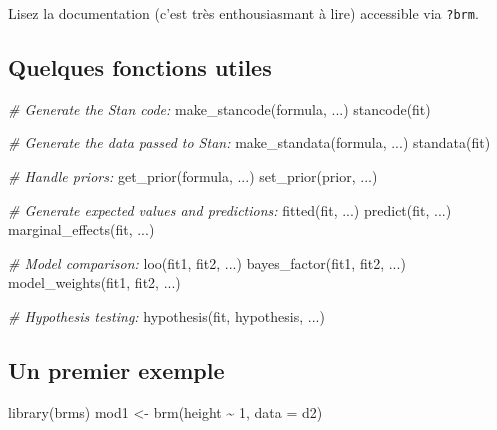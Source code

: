 \documentclass[
  a4paper,11pt,twoside,onecolumn,openright,final,oldfontcommands]{memoir}
\newenvironment{Shaded}{\begin{snugshade}}{\end{snugshade}}
\newcommand{\AttributeTok}[1]{\textcolor[rgb]{0.77,0.63,0.00}{#1}}
\newcommand{\CommentTok}[1]{\textcolor[rgb]{0.56,0.35,0.01}{\textit{#1}}}
\newcommand{\DecValTok}[1]{\textcolor[rgb]{0.00,0.00,0.81}{#1}}
\newcommand{\FunctionTok}[1]{\textcolor[rgb]{0.00,0.00,0.00}{#1}}
\newcommand{\NormalTok}[1]{#1}
\newcommand{\OtherTok}[1]{\textcolor[rgb]{0.56,0.35,0.01}{#1}}
\newcommand{\SpecialCharTok}[1]{\textcolor[rgb]{0.00,0.00,0.00}{#1}}
\theoremstyle{definition}
\theoremstyle{definition}
\theoremstyle{definition}
\theoremstyle{definition}
\theoremstyle{remark}
\begin{document}
Lisez la documentation (c'est très enthousiasmant à lire) accessible via \texttt{?brm}.

\hypertarget{quelques-fonctions-utiles}{%
\subsection{Quelques fonctions utiles}\label{quelques-fonctions-utiles}}

\begin{Shaded}
\begin{Highlighting}[]
\CommentTok{\# Generate the Stan code:}
\FunctionTok{make\_stancode}\NormalTok{(formula, ...)}
\FunctionTok{stancode}\NormalTok{(fit)}

\CommentTok{\# Generate the data passed to Stan:}
\FunctionTok{make\_standata}\NormalTok{(formula, ...)}
\FunctionTok{standata}\NormalTok{(fit)}

\CommentTok{\# Handle priors:}
\FunctionTok{get\_prior}\NormalTok{(formula, ...)}
\FunctionTok{set\_prior}\NormalTok{(prior, ...)}

\CommentTok{\# Generate expected values and predictions:}
\FunctionTok{fitted}\NormalTok{(fit, ...)}
\FunctionTok{predict}\NormalTok{(fit, ...)}
\FunctionTok{marginal\_effects}\NormalTok{(fit, ...)}

\CommentTok{\# Model comparison:}
\FunctionTok{loo}\NormalTok{(fit1, fit2, ...)}
\FunctionTok{bayes\_factor}\NormalTok{(fit1, fit2, ...)}
\FunctionTok{model\_weights}\NormalTok{(fit1, fit2, ...)}

\CommentTok{\# Hypothesis testing:}
\FunctionTok{hypothesis}\NormalTok{(fit, hypothesis, ...)}
\end{Highlighting}
\end{Shaded}

\hypertarget{un-premier-exemple}{%
\subsection{Un premier exemple}\label{un-premier-exemple}}

\begin{Shaded}
\begin{Highlighting}[]
\FunctionTok{library}\NormalTok{(brms)}
\NormalTok{mod1 }\OtherTok{\textless{}{-}} \FunctionTok{brm}\NormalTok{(height }\SpecialCharTok{\textasciitilde{}} \DecValTok{1}\NormalTok{, }\AttributeTok{data =}\NormalTok{ d2)}
\end{Highlighting}
\end{Shaded}
\end{document}
